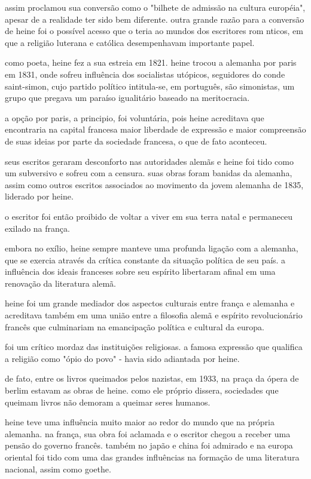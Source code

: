 assim proclamou sua conversão como o "bilhete de admissão na cultura européia", apesar de a realidade ter sido bem diferente. outra grande razão para a conversão de heine foi o possível acesso que o teria ao mundos dos escritores rom nticos, em que a religião luterana e católica desempenhavam importante papel.

como poeta, heine fez a sua estreia em 1821. heine trocou a alemanha por paris em 1831, onde sofreu influência dos socialistas utópicos, seguidores do conde saint-simon, cujo partido político intitula-se, em português, são simonistas, um grupo que pregava um paraíso igualitário baseado na meritocracia.

a opção por paris, a principio, foi voluntária, pois heine acreditava que encontraria na capital francesa maior liberdade de expressão e maior compreensão de suas ideias por parte da sociedade francesa, o que de fato aconteceu.

seus escritos geraram desconforto nas autoridades alemãs e heine foi tido como um subversivo e sofreu com a censura. suas obras foram banidas da alemanha, assim como outros escritos associados ao movimento da jovem alemanha de 1835, liderado por heine. 

o escritor foi então proibido de voltar a viver em sua terra natal e permaneceu exilado na frança.

embora no exílio, heine sempre manteve uma profunda ligação com a alemanha, que se exercia através da crítica constante da situação política de seu país. a influência dos ideais franceses sobre seu espírito libertaram afinal em uma renovação da literatura alemã.

heine foi um grande mediador dos aspectos culturais entre frança e alemanha e acreditava também em uma união entre a filosofia alemã e espírito revolucionário francês que culminariam na emancipação política e cultural da europa.

foi um crítico mordaz das instituições religiosas. a famosa expressão que qualifica a religião como "ópio do povo" - havia sido adiantada por heine. 

de fato, entre os livros queimados pelos nazistas, em 1933, na praça da ópera de berlim estavam as obras de heine. como ele próprio dissera, sociedades que queimam livros não demoram a queimar seres humanos.

heine teve uma influência muito maior ao redor do mundo que na própria alemanha. na frança, sua obra foi aclamada e o escritor chegou a receber uma pensão do governo francês. também no japão e china foi admirado e na europa oriental foi tido com uma das grandes influências na formação de uma literatura nacional, assim como goethe.

